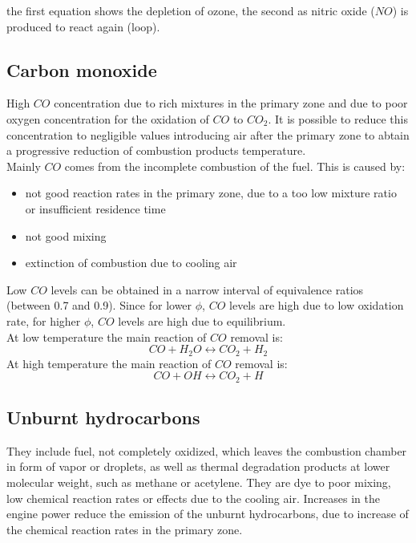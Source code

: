\documentclass[12pt]{article}
\begin{document}
the first equation shows the depletion of ozone, the second as nitric oxide ($NO$) is produced to react again (loop).

\subsection{Carbon monoxide}

High $CO$ concentration due to rich mixtures in the primary zone and due to poor oxygen concentration for the oxidation of $CO$ to $CO_{2}$. It is possible to reduce this concentration to negligible values introducing air after the primary zone to abtain a progressive reduction of combustion products temperature.\\
Mainly $CO$ comes from the incomplete combustion of the fuel. This is caused by:
\begin{itemize}
    \item not good reaction rates in the primary zone, due to a too low mixture ratio or insufficient residence time
    \item not good mixing
    \item extinction of combustion due to cooling air
\end{itemize}

Low $CO$ levels can be obtained in a narrow interval of equivalence ratios (between 0.7 and 0.9). Since for lower $\phi$, $CO$ levels are high due to low oxidation rate, for higher $\phi$, $CO$ levels are high due to equilibrium.\\
At low temperature the main reaction of $CO$ removal is:
\begin{equation}
    CO+H_{2}O \leftrightarrow CO_{2}+H_{2}
\end{equation}
At high temperature the main reaction of $CO$ removal is:
\begin{equation}
    CO+OH \leftrightarrow CO_{2}+H
\end{equation}

\subsection{Unburnt hydrocarbons}

They include fuel, not completely oxidized, which leaves the combustion chamber in form of vapor or droplets, as well as thermal degradation products at lower molecular weight, such as methane or acetylene. They are dye to poor mixing, low chemical reaction rates or effects due to the cooling air. Increases in the engine power reduce the emission of the unburnt hydrocarbons, due to increase of the chemical reaction rates in the primary zone.
\end{document}
